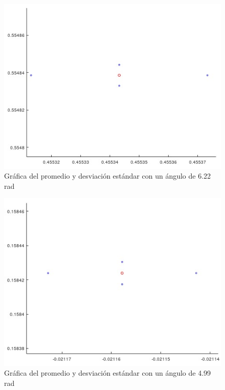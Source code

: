 \documentclass[a4paper, 12pt]{article}
\begin{document}
    \begin{figure}[ht!]
        \centering
        \includegraphics[width=12cm]{img/g3.jpeg}
        \caption{Gráfica del promedio y desviación estándar con un ángulo de 6.22 rad}
        \label{G3}
    \end{figure}

    \begin{figure}[ht!]
        \centering
        \includegraphics[width=12cm]{img/g4.jpeg}
        \caption{Gráfica del promedio y desviación estándar con un ángulo de 4.99 rad}
        \label{G4}
    \end{figure}
\end{document}
